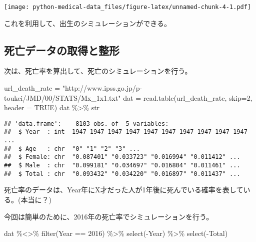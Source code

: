 \documentclass[
]{book}
\newenvironment{Shaded}{\begin{snugshade}}{\end{snugshade}}
\newcommand{\AttributeTok}[1]{\textcolor[rgb]{0.77,0.63,0.00}{#1}}
\newcommand{\ConstantTok}[1]{\textcolor[rgb]{0.00,0.00,0.00}{#1}}
\newcommand{\DecValTok}[1]{\textcolor[rgb]{0.00,0.00,0.81}{#1}}
\newcommand{\FunctionTok}[1]{\textcolor[rgb]{0.00,0.00,0.00}{#1}}
\newcommand{\NormalTok}[1]{#1}
\newcommand{\OtherTok}[1]{\textcolor[rgb]{0.56,0.35,0.01}{#1}}
\newcommand{\SpecialCharTok}[1]{\textcolor[rgb]{0.00,0.00,0.00}{#1}}
\newcommand{\StringTok}[1]{\textcolor[rgb]{0.31,0.60,0.02}{#1}}
\begin{document}
\texttt{[image: python-medical-data\_files/figure-latex/unnamed-chunk-4-1.pdf]}

これを利用して、出生のシミュレーションができる。

\hypertarget{ux6b7bux4ea1ux30c7ux30fcux30bfux306eux53d6ux5f97ux3068ux6574ux5f62}{%
\subsection{死亡データの取得と整形}\label{ux6b7bux4ea1ux30c7ux30fcux30bfux306eux53d6ux5f97ux3068ux6574ux5f62}}

次は、死亡率を算出して、死亡のシミュレーションを行う。

\begin{Shaded}
\begin{Highlighting}[]
\NormalTok{url\_death\_rate }\OtherTok{=} \StringTok{"http://www.ipss.go.jp/p{-}toukei/JMD/00/STATS/Mx\_1x1.txt"}
\NormalTok{dat }\OtherTok{=} \FunctionTok{read.table}\NormalTok{(url\_death\_rate, }\AttributeTok{skip=}\DecValTok{2}\NormalTok{, }\AttributeTok{header =} \ConstantTok{TRUE}\NormalTok{)}
\NormalTok{dat }\SpecialCharTok{\%\textgreater{}\%}\NormalTok{ str}
\end{Highlighting}
\end{Shaded}

\begin{verbatim}
## 'data.frame':    8103 obs. of  5 variables:
##  $ Year  : int  1947 1947 1947 1947 1947 1947 1947 1947 1947 1947 ...
##  $ Age   : chr  "0" "1" "2" "3" ...
##  $ Female: chr  "0.087401" "0.033723" "0.016994" "0.011412" ...
##  $ Male  : chr  "0.099181" "0.034697" "0.016804" "0.011461" ...
##  $ Total : chr  "0.093432" "0.034220" "0.016897" "0.011437" ...
\end{verbatim}

死亡率のデータは、Year年にX才だった人が1年後に死んでいる確率を表している。(本当に？)

今回は簡単のために、2016年の死亡率でシミュレーションを行う。

\begin{Shaded}
\begin{Highlighting}[]
\NormalTok{dat }\SpecialCharTok{\%\textless{}\textgreater{}\%} 
        \FunctionTok{filter}\NormalTok{(Year }\SpecialCharTok{==} \DecValTok{2016}\NormalTok{) }\SpecialCharTok{\%\textgreater{}\%} 
        \FunctionTok{select}\NormalTok{(}\SpecialCharTok{{-}}\NormalTok{Year) }\SpecialCharTok{\%\textgreater{}\%} 
        \FunctionTok{select}\NormalTok{(}\SpecialCharTok{{-}}\NormalTok{Total)}
\end{Highlighting}
\end{Shaded}
\end{document}
